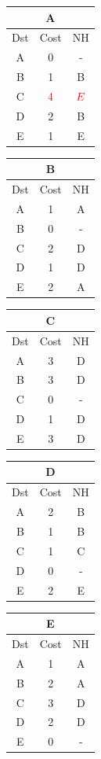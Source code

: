\documentclass[10pt]{article}
\begin{document}
			\begin{table}[h!]
				\begin{tabular}{|c||c||c|}
					\hline
					\multicolumn{3}{|c|}{A} \\
					\hline
					Dst & Cost & NH\\
					\hline
					A & 0 & - \\
					B & 1 & B \\
					C & $\color{red} 4$ & $\color{red} E$ \\
					D & 2 & B \\
					E & 1 & E \\
					\hline
				\end{tabular}
				\begin{tabular}{|c||c||c|}
					\hline
					\multicolumn{3}{|c|}{B} \\
					\hline
					Dst & Cost & NH\\
					\hline
					A & 1 & A \\
					B & 0 & - \\
					C & 2 & D \\
					D & 1 & D \\
					E & 2 & A \\
					\hline
				\end{tabular}
				\begin{tabular}{|c||c||c|}
					\hline
					\multicolumn{3}{|c|}{C} \\
					\hline
					Dst & Cost & NH\\
					\hline
					A & 3 & D \\
					B &3 & D \\
					C & 0 & - \\
					D & 1 & D \\
					E & 3 & D \\
					\hline
				\end{tabular}
				\begin{tabular}{|c||c||c|}
					\hline
					\multicolumn{3}{|c|}{D} \\
					\hline
					Dst & Cost & NH\\
					\hline
					A & 2 & B \\
					B & 1 & B \\
					C & 1 & C \\
					D & 0 & - \\
					E & 2 & E \\
					\hline
				\end{tabular}
				\begin{tabular}{|c||c||c|}
					\hline
					\multicolumn{3}{|c|}{E} \\
					\hline
					Dst & Cost & NH\\
					\hline
					A & 1 & A \\
					B & 2 & A \\
					C & 3 & D \\
					D & 2 & D \\
					E & 0 & - \\
					\hline
				\end{tabular}
			\end{table}
\end{document}
